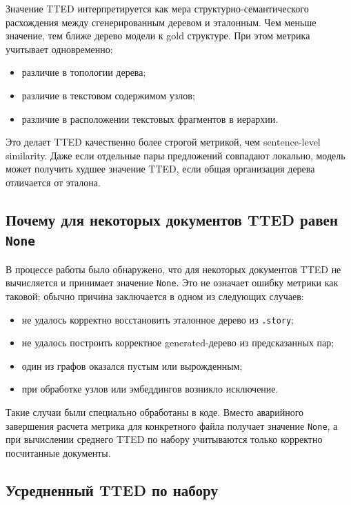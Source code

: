 \documentclass[12pt,a4paper]{article}
\begin{document}
Значение TTED интерпретируется как мера структурно-семантического расхождения между
сгенерированным деревом и эталонным. Чем меньше значение, тем ближе дерево модели к gold
структуре. При этом метрика учитывает одновременно:

\begin{itemize}
    \item различие в топологии дерева;
    \item различие в текстовом содержимом узлов;
    \item различие в расположении текстовых фрагментов в иерархии.
\end{itemize}

Это делает TTED качественно более строгой метрикой, чем sentence-level similarity. Даже
если отдельные пары предложений совпадают локально, модель может получить худшее значение
TTED, если общая организация дерева отличается от эталона.

\subsection{Почему для некоторых документов TTED равен \texttt{None}}

В процессе работы было обнаружено, что для некоторых документов TTED не вычисляется и
принимает значение \texttt{None}. Это не означает ошибку метрики как таковой; обычно
причина заключается в одном из следующих случаев:

\begin{itemize}
    \item не удалось корректно восстановить эталонное дерево из \texttt{.story};
    \item не удалось построить корректное generated-дерево из предсказанных пар;
    \item один из графов оказался пустым или вырожденным;
    \item при обработке узлов или эмбеддингов возникло исключение.
\end{itemize}

Такие случаи были специально обработаны в коде. Вместо аварийного завершения расчета
метрика для конкретного файла получает значение \texttt{None}, а при вычислении среднего
TTED по набору учитываются только корректно посчитанные документы.

\subsection{Усредненный TTED по набору}
\end{document}

